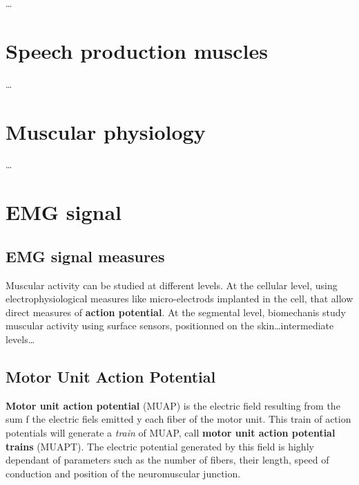 \documentclass[12pt,]{book}
\begin{document}
\ldots{}

\section{Speech production muscles}\label{speech-production-muscles}

\ldots{}

\section{Muscular physiology}\label{muscular-physiology}

\ldots{}

\section{EMG signal}\label{emg-signal}

\subsection{EMG signal measures}\label{emg-signal-measures}

Muscular activity can be studied at different levels. At the cellular
level, using electrophysiological measures like micro-electrods
implanted in the cell, that allow direct measures of \textbf{action
potential}. At the segmental level, biomechanis study muscular activity
using surface sensors, positionned on the skin\ldots{}intermediate
levels\ldots{}

\subsection{Motor Unit Action
Potential}\label{motor-unit-action-potential}

\textbf{Motor unit action potential} (MUAP) is the electric field
resulting from the sum f the electric fiels emitted y each fiber of the
motor unit. This train of action potentials will generate a \emph{train}
of MUAP, call \textbf{motor unit action potential trains} (MUAPT). The
electric potential generated by this field is highly dependant of
parameters such as the number of fibers, their length, speed of
conduction and position of the neuromuscular junction.
\end{document}
